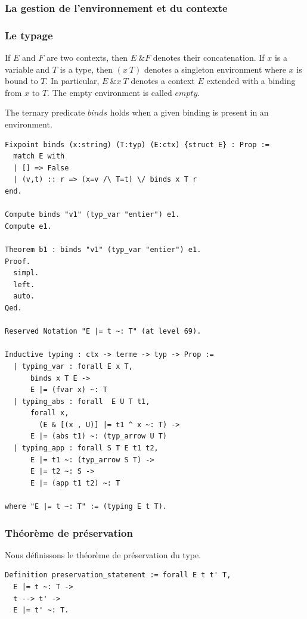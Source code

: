 \subsubsection{La gestion de l'environnement et du contexte}
    

\subsubsection{Le typage} 

 If $E$ and $F$ are two contexts, then $E\ \& F$ denotes their 
    concatenation. If $x$ is a variable and $T$ is a type, then 
    $(x ~ T)$ denotes a singleton environment where $x$ is bound to $T$.
    In particular, $E\ \& x ~ T$ denotes a context $E$ extended 
    with a binding from $x$ to $T$. The empty environment is 
    called $empty$.

The ternary predicate $binds$ holds when a given binding is
    present in an environment.  

\begin{Verbatim}
Fixpoint binds (x:string) (T:typ) (E:ctx) {struct E} : Prop :=
  match E with
  | [] => False
  | (v,t) :: r => (x=v /\ T=t) \/ binds x T r
end.

Compute binds "v1" (typ_var "entier") e1.
Compute e1.

Theorem b1 : binds "v1" (typ_var "entier") e1.
Proof.
  simpl.
  left.
  auto.
Qed.

Reserved Notation "E |= t ~: T" (at level 69).

Inductive typing : ctx -> terme -> typ -> Prop :=
  | typing_var : forall E x T,
      binds x T E ->
      E |= (fvar x) ~: T
  | typing_abs : forall  E U T t1,
      forall x,  
        (E & [(x , U)] |= t1 ^ x ~: T) ->
      E |= (abs t1) ~: (typ_arrow U T)
  | typing_app : forall S T E t1 t2,
      E |= t1 ~: (typ_arrow S T) -> 
      E |= t2 ~: S ->
      E |= (app t1 t2) ~: T

where "E |= t ~: T" := (typing E t T).
\end{Verbatim}

\subsubsection{Théorème de préservation}
Nous définissons le théorème de préservation du type.
\begin{Verbatim}
Definition preservation_statement := forall E t t' T,
  E |= t ~: T ->
  t --> t' ->
  E |= t' ~: T.
\end{Verbatim}

